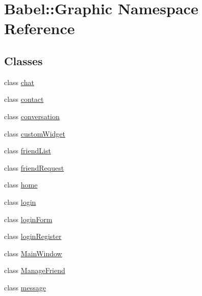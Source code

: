 \hypertarget{namespaceBabel_1_1Graphic}{}\section{Babel\+:\+:Graphic Namespace Reference}
\label{namespaceBabel_1_1Graphic}
\subsection*{Classes}
\begin{DoxyCompactItemize}
\item 
class \hyperlink{classBabel_1_1Graphic_1_1chat}{chat}
\item 
class \hyperlink{classBabel_1_1Graphic_1_1contact}{contact}
\item 
class \hyperlink{classBabel_1_1Graphic_1_1conversation}{conversation}
\item 
class \hyperlink{classBabel_1_1Graphic_1_1customWidget}{custom\+Widget}
\item 
class \hyperlink{classBabel_1_1Graphic_1_1friendList}{friend\+List}
\item 
class \hyperlink{classBabel_1_1Graphic_1_1friendRequest}{friend\+Request}
\item 
class \hyperlink{classBabel_1_1Graphic_1_1home}{home}
\item 
class \hyperlink{classBabel_1_1Graphic_1_1login}{login}
\item 
class \hyperlink{classBabel_1_1Graphic_1_1loginForm}{login\+Form}
\item 
class \hyperlink{classBabel_1_1Graphic_1_1loginRegister}{login\+Register}
\item 
class \hyperlink{classBabel_1_1Graphic_1_1MainWindow}{Main\+Window}
\item 
class \hyperlink{classBabel_1_1Graphic_1_1ManageFriend}{Manage\+Friend}
\item 
class \hyperlink{classBabel_1_1Graphic_1_1message}{message}
\end{DoxyCompactItemize}
